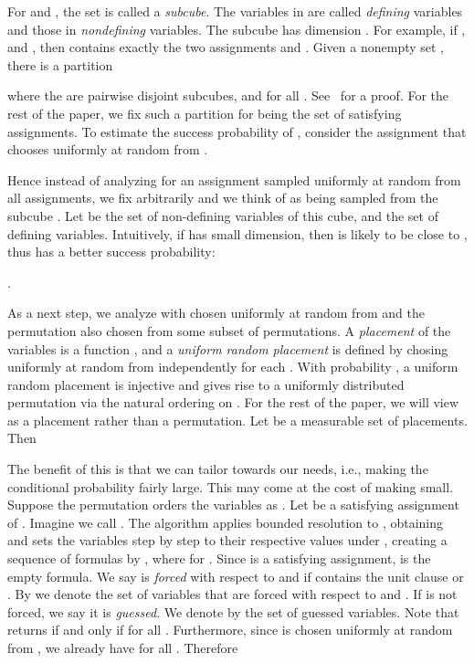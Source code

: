  For  and , the
set  is called a \emph{subcube}. The variables in 
are called \emph{defining} variables and those in 
\emph{nondefining} variables. The subcube  has dimension
.  For example, if ,  and , then  contains
exactly the two assignments  and . Given a nonempty
set , there is a partition

where the  are pairwise disjoint subcubes, and  for all . See~\cite{ppsz} for a proof.  For
the rest of the paper, we fix such a partition for  being the set
of satisfying assignments. To estimate the success probability of
, consider the assignment  that  chooses
uniformly at random from .

Hence instead of analyzing  for an
assignment  sampled uniformly at random from all assignments, we fix  arbitrarily and
we think of  as being sampled from the subcube .  Let
 be the set of non-defining variables of this cube, and
 the set of defining variables.  Intuitively, if
 has small dimension, then  is likely to be close to
, thus  has a better success probability:
\begin{lemma}[\cite{it04}]
  .
  \label{lemma-schoening-IT}
\end{lemma}

As a next step, we analyze
 with  chosen uniformly at random from
 and the permutation also chosen from some subset of
permutations. A {\em placement} of the variables  is a function
, and a {\em uniform random placement} is defined
by chosing  uniformly at random from  independently
for each .  With probability , a uniform random placement is
injective and gives rise to a uniformly distributed permutation via
the natural ordering  on . For the rest of the paper, we
will view  as a placement rather than a permutation. Let 
be a measurable set of placements.  Then

The benefit of this is that we can tailor  towards our needs,
i.e., making the conditional probability  fairly large. This may come at
the cost of making  small.\\

Suppose the permutation  orders the
variables  as . Let  be a satisfying
assignment of . Imagine we call . The
algorithm applies bounded resolution to , obtaining  and sets the variables 
step by step to their respective values under , creating a
sequence of formulas by , where  for . Since
 is a satisfying assignment,  is the empty formula. We
say  is {\em forced} with respect to  and  if
 contains the unit clause  or . By
 we denote the set of variables  that are
forced with respect to  and . If  is not forced, we
say it is {\em guessed}. We denote by  the set
of guessed variables. Note that  returns 
if and only if  for all .  Furthermore, since  is chosen uniformly
at random from , we already have  for
all . Therefore

